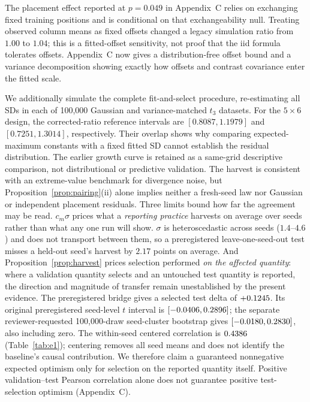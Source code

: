 The placement effect reported at $p=0.049$ in Appendix~C relies on exchanging
fixed training positions and is conditional on that exchangeability null.
Treating observed column means as fixed offsets changed a legacy simulation
ratio from $1.00$ to $1.04$; this is a fitted-offset sensitivity, not proof
that the iid formula tolerates offsets. Appendix~C now gives a distribution-free
offset bound and a variance decomposition showing exactly how offsets and
contrast covariance enter the fitted scale.

We additionally simulate the complete fit-and-select procedure, re-estimating
all SDs in each of 100,000 Gaussian and variance-matched $t_3$ datasets.
For the $5\times6$ design, the corrected-ratio reference intervals are
$[0.8087,1.1979]$ and $[0.7251,1.3014]$, respectively. Their overlap shows
why comparing expected-maximum constants with a fixed fitted SD cannot
establish the residual distribution. The earlier growth curve is retained as
a same-grid descriptive comparison, not distributional or predictive validation.
The
harvest is consistent with an extreme-value benchmark for divergence noise,
but Proposition~\ref{prop:pairing}(ii) alone implies neither a fresh-seed law
nor Gaussian or independent placement residuals. Three limits bound how far
the agreement may be read. $c_m\sigma$
prices what a \emph{reporting practice} harvests on average over seeds rather
than what any one run will show. $\sigma$ is heteroscedastic across seeds
($1.4$--$4.6$) and does not transport between them, so a preregistered
leave-one-seed-out test misses a held-out seed's harvest by $2.17$ points on
average\evidencefigs{}. And Proposition~\ref{prop:harvest} prices selection
performed \emph{on the affected quantity}: where a validation quantity selects
and an untouched test quantity is reported, the direction and magnitude of transfer remain unestablished
by the present evidence. The preregistered bridge gives a selected
test delta of $+0.1245$. Its original preregistered seed-level $t$
interval is $[-0.0406,0.2896]$; the separate reviewer-requested
100,000-draw seed-cluster bootstrap gives
$[-0.0180,0.2830]$, also including zero. The within-seed
centered correlation is $0.4386$ (Table~\ref{tab:e1}); centering removes
all seed means and does not identify the baseline's causal contribution.
We therefore
claim a guaranteed nonnegative expected optimism only for selection on the
reported quantity itself. Positive validation--test Pearson correlation
alone does not guarantee positive test-selection optimism (Appendix~C).

